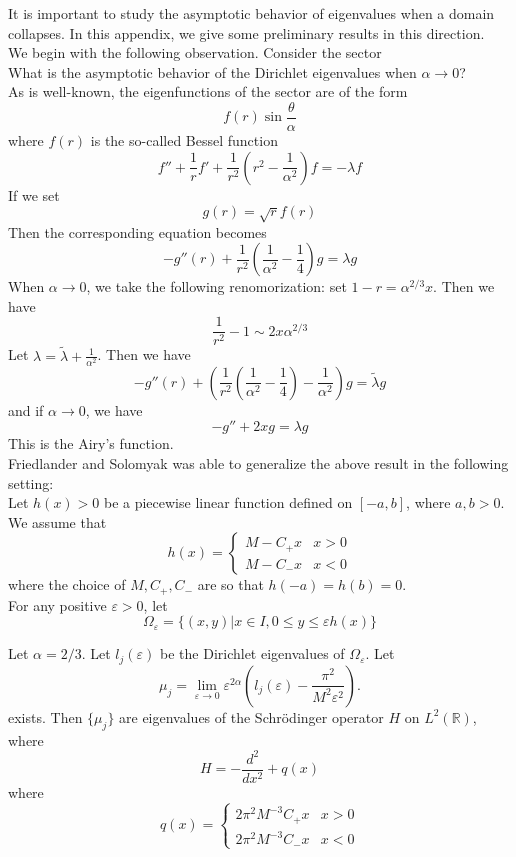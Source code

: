 It is important to study the asymptotic behavior of eigenvalues when a domain
collapses. In this appendix, we give some preliminary results in this direction.
\\

We begin with the following observation. Consider the sector
\\%
What is the asymptotic behavior of the Dirichlet eigenvalues when
$\alpha\rightarrow 0$?
\\

As is well-known, the eigenfunctions of the sector are of the form
\[
f(r)\sin\frac{\theta}{\alpha}
\]
where $f(r)$ is the so-called Bessel function
\[
f'' + \frac{1}{r}f' + \frac{1}{r^2}(r^2 - \frac{1}{\alpha^2})f = -\lambda f
\]
If we set
\[
g(r) = \sqrt{r} f(r)
\]
Then the corresponding equation becomes
\[
-g''(r) + \frac{1}{r^2}(\frac{1}{\alpha^2}-\frac{1}{4})g = \lambda g
\]
When $\alpha\rightarrow 0$, we take the following renomorization:
set $1 - r = \alpha^{2/3}x$. Then we have
\[
\frac{1}{r^2} - 1 \sim 2x\alpha^{2/3}
\]
Let $\lambda = \widetilde\lambda + \frac{1}{\alpha^2}$. Then we have
\[
-g''(r) + \left(\frac{1}{r^2}\left(\frac{1}{\alpha^2}-\frac{1}{4}\right)-
\frac{1}{\alpha^2}\right)g
= \widetilde\lambda g
\]
and if $\alpha\rightarrow 0$, we have
\[
-g'' + 2xg = \lambda g
\]
This is the Airy's function.
\\

Friedlander and Solomyak was able to generalize the above result in the 
following setting:
\\

Let $h(x) > 0$ be a piecewise linear function defined on $[-a, b]$, where
$a, b > 0$. We assume that
\[
h(x) = \left\{
\begin{array}{ll}
M-C_+x & x > 0 \\
M-C_-x & x < 0
\end{array}
\right.
\]
where the choice of $M, C_+, C_-$ are so that $h(-a) = h(b) = 0$.
\\

For any positive $\varepsilon > 0$, let
\[
\Omega_\varepsilon = \{(x,y)|x\in I, 0\leqslant y \leqslant \varepsilon h(x)\}
\]
\begin{theorem}
 Let $\alpha = 2/3$. Let $l_j(\varepsilon)$ be the
Dirichlet eigenvalues of $\Omega_\varepsilon$. Let
\[
\mu_j = \lim_{\varepsilon\rightarrow 0}
\varepsilon^{2\alpha}
\left(l_j(\varepsilon) - \frac{\pi^2}{M^2\varepsilon^2}\right).
\]
exists. Then $\{\mu_j\}$ are eigenvalues of the Schr\"{o}dinger operator $H$ on
$L^2(\mathbb{R})$, where
\[
H = -\frac{d^2}{dx^2} + q(x)
\]
where
\[
q(x) = \left\{
\begin{array}{ll}
2\pi^2 M^{-3} C_+x & x > 0 \\
2\pi^2 M^{-3} C_-x & x < 0
\end{array}
\right.
\]
\end{theorem}

